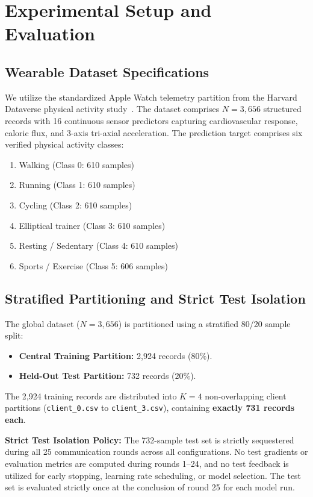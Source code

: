 \documentclass[journal,twocolumn,10pt]{IEEEtran}
\begin{document}
\section{Experimental Setup and Evaluation}
\subsection{Wearable Dataset Specifications}
We utilize the standardized Apple Watch telemetry partition from the Harvard Dataverse physical activity study~\cite{fuller2020applewatch}. The dataset comprises $N = 3,656$ structured records with 16 continuous sensor predictors capturing cardiovascular response, caloric flux, and 3-axis tri-axial acceleration. The prediction target comprises six verified physical activity classes:
\begin{enumerate}
    \item Walking (Class 0: 610 samples)
    \item Running (Class 1: 610 samples)
    \item Cycling (Class 2: 610 samples)
    \item Elliptical trainer (Class 3: 610 samples)
    \item Resting / Sedentary (Class 4: 610 samples)
    \item Sports / Exercise (Class 5: 606 samples)
\end{enumerate}

\subsection{Stratified Partitioning and Strict Test Isolation}
The global dataset ($N = 3,656$) is partitioned using a stratified 80/20 sample split:
\begin{itemize}
    \item \textbf{Central Training Partition:} 2,924 records ($80\%$).
    \item \textbf{Held-Out Test Partition:} 732 records ($20\%$).
\end{itemize}
The 2,924 training records are distributed into $K = 4$ non-overlapping client partitions (\texttt{client\_0.csv} to \texttt{client\_3.csv}), containing \textbf{exactly 731 records each}.

\textbf{Strict Test Isolation Policy:} The 732-sample test set is strictly sequestered during all 25 communication rounds across all configurations. No test gradients or evaluation metrics are computed during rounds 1--24, and no test feedback is utilized for early stopping, learning rate scheduling, or model selection. The test set is evaluated strictly once at the conclusion of round 25 for each model run.
\end{document}

